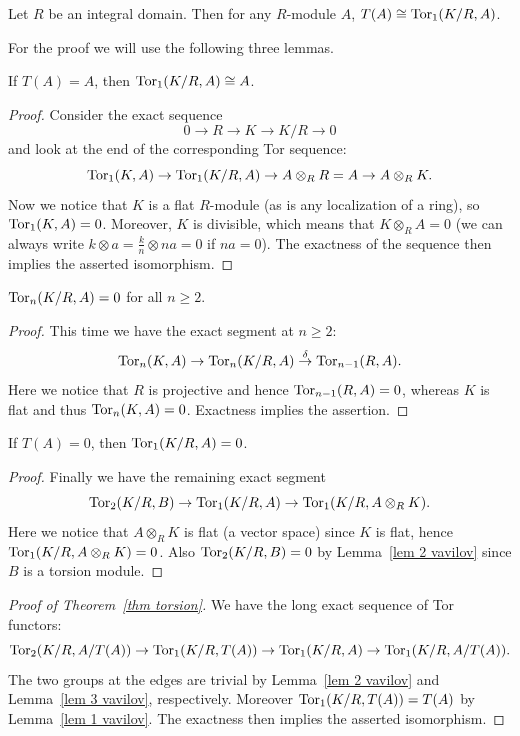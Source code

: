 \begin{thm}\label{thm torsion}
    Let $R$ be an integral domain. Then for any $R$-module $A$, $T(A)\cong \operatorname{Tor}_1(K\slash R,A)$.
\end{thm}
For the proof we will use the following three lemmas.
\begin{lem}\label{lem 1 vavilov}
    If $T(A)=A$, then $\operatorname{Tor}_1(K\slash R,A)\cong A$.
\end{lem}
\begin{proof}
    Consider the exact sequence
    \[0\to  R\to K\to K\slash R\to 0\]
    and look at the end of the corresponding Tor sequence:
    \[\operatorname{Tor}_1(K,A)\to \operatorname{Tor}_1(K\slash R,A)\to A\otimes_R R=A\to A\otimes_R K.\]
    Now we notice that $K$ is a flat $R$-module (as is any localization of a ring), so $\operatorname{Tor}_1(K,A)=0$. Moreover, $K$ is divisible, which means that $K\otimes_R A=0$ (we can always write $k\otimes a=\frac kn\otimes na=0$ if $na=0$). The exactness of the sequence then implies the asserted isomorphism.
\end{proof}

\begin{lem}\label{lem 2 vavilov}
    $\operatorname{Tor}_n(K\slash R,A)=0$ for all $n\geq 2$.
\end{lem}
\begin{proof}
    This time we have the exact segment at $n\geq 2$:
    \[\operatorname{Tor}_n(K,A)\to \operatorname{Tor}_n(K\slash R,A)\overset{\delta}{\to}\operatorname{Tor}_{n-1}(R,A).\]
    Here we notice that $R$ is projective and hence $\operatorname{Tor}_{n-1}(R,A)=0$, whereas $K$ is flat and thus $\operatorname{Tor}_n(K,A)=0$. Exactness implies the assertion.
\end{proof}

\begin{lem}\label{lem 3 vavilov}
    If $T(A)=0$, then $\operatorname{Tor}_1(K\slash R,A)=0$.
\end{lem}
\begin{proof}
    Finally we have the remaining exact segment
    \[\operatorname{Tor}_2(K\slash R,B)\to\operatorname{Tor}_1(K\slash R,A)\to \operatorname{Tor}_1(K\slash R,A\otimes_R K).\]
    Here we notice that $A\otimes_R K$ is flat (a vector space) since $K$ is flat, hence $\operatorname{Tor}_1(K\slash R,A\otimes_R K)=0$. Also $\operatorname{Tor}_2(K\slash R,B)=0$ by Lemma~\ref{lem 2 vavilov} since $B$ is a torsion module.
\end{proof}

\begin{proof}[Proof of Theorem~\ref{thm torsion}]
    We have the long exact sequence of Tor functors:
    \[\operatorname{Tor}_2(K\slash R,A\slash T(A))\to \operatorname{Tor}_1(K\slash R,T(A))\to \operatorname{Tor}_1(K\slash R,A)\to \operatorname{Tor}_1(K\slash R,A\slash T(A)).\]
    The two groups at the edges are trivial by Lemma~\ref{lem 2 vavilov} and Lemma~\ref{lem 3 vavilov}, respectively. Moreover $\operatorname{Tor}_1(K\slash R,T(A))=T(A)$ by Lemma~\ref{lem 1 vavilov}. The exactness then implies the asserted isomorphism.
\end{proof}

